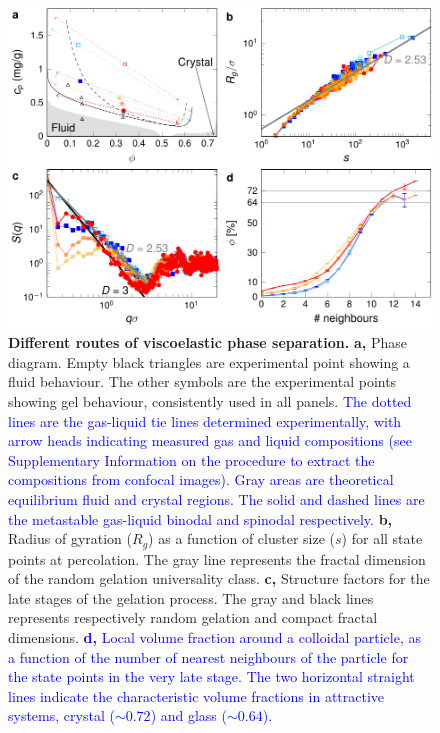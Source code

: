 \documentclass[preprint,amsmath,amssymb,superscriptaddress]{revtex4-1}
\begin{document}
\begin{figure}[!t]
 \centering
 \includegraphics{phase_separation.pdf}
 \caption{{\bf Different routes of viscoelastic phase separation.} 
{\bf a,} Phase diagram. Empty black triangles are experimental point showing a fluid behaviour. The other symbols are the experimental points showing gel behaviour, consistently used in all panels. \textcolor{blue}{The dotted lines are the gas-liquid tie lines determined experimentally, with arrow heads indicating measured gas and liquid compositions (see Supplementary Information on the procedure to extract the compositions from confocal images).  Gray areas are theoretical equilibrium fluid and crystal regions. The solid and dashed lines are the metastable gas-liquid binodal and spinodal respectively.}
{\bf b,} Radius of gyration ($R_g$) as a function of cluster size ($s$) for all state points at percolation. The
 gray line represents the fractal dimension of the random gelation universality class.
{\bf c,} Structure factors for the late stages of the gelation process. The gray and black lines represents respectively random gelation and compact fractal dimensions.
\textcolor{blue}{{\bf d,} Local volume fraction around a colloidal particle, as a function of the number of nearest neighbours of the particle for the state points in the very late stage. 
The two horizontal straight lines indicate the characteristic volume fractions in attractive systems, crystal ($\sim 0.72$) and glass ($\sim 0.64$). }
 }
 \label{fig:phase_separation}
\end{figure}
\end{document}
